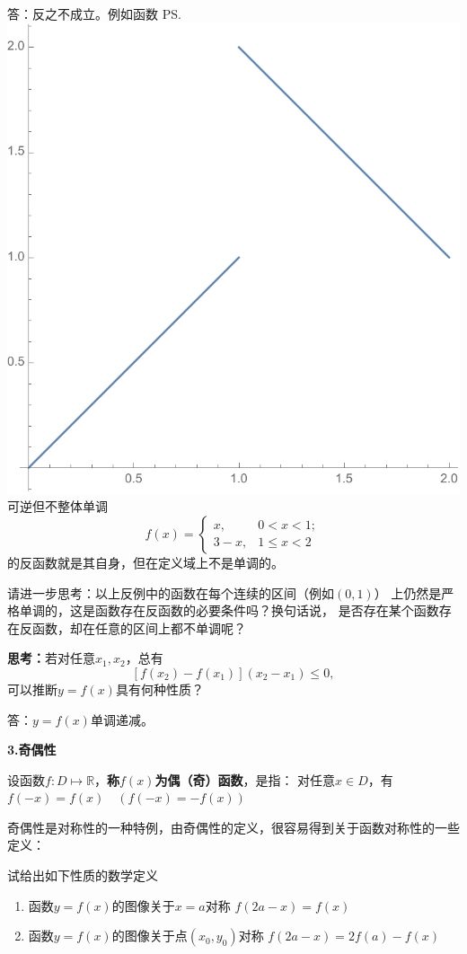 \ifhint
答：反之不成立。例如函数
\ps{\centering
\includegraphics[width=\marginparwidth]{./images/ch01/pswsRef.pdf}
可逆但不整体单调}
$$f(x)=\left\{\begin{array}{ll}
	x,&0<x<1;\\
	3-x,&1\leq x<2
\end{array}\right.$$
的反函数就是其自身，但在定义域上不是单调的。\fin

请进一步思考：以上反例中的函数在每个连续的区间（例如$(0,1)$）
上仍然是严格单调的，这是函数存在反函数的必要条件吗？换句话说，
是否存在某个函数存在反函数，却在任意的区间上都不单调呢？
\fi

\bs
{\bf 思考：}若对任意$x_1,x_2$，总有
$$[f(x_2)-f(x_1)](x_2-x_1)\leq 0,$$
可以推断$y=f(x)$具有何种性质？

\ifhint
答：$y=f(x)$单调递减。
\fi

\bs

{\bf 3.奇偶性}

设函数$f:D\mapsto\mathbb{R}$，{\bf 称$f(x)$为偶（奇）函数}，是指：
对任意$x\in D$，有$f(-x)=f(x)\quad(f(-x)=-f(x))$

奇偶性是对称性的一种特例，由奇偶性的定义，很容易得到关于函数对称性的一些定义：

\bs
\egz 试给出如下性质的数学定义
\begin{enumerate}[(1)]
  \setlength{\itemindent}{1cm}
  \item 函数$y=f(x)$的图像关于$x=a$对称
  \dotfill$f(2a-x)=f(x)$
  \item 函数$y=f(x)$的图像关于点$(x_0,y_0)$对称
  \dotfill $f(2a-x)=2f(a)-f(x)$
\end{enumerate}

